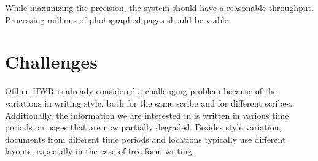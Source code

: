 



While maximizing the precision, the system should have a reasonable throughput. Processing millions of photographed pages should be viable.

\section{Challenges}

Offline HWR is already considered a challenging problem because of the variations in writing style, both for the same scribe and for different scribes.
Additionally, the information we are interested in is written in various time periods on pages that are now partially degraded.
Besides style variation, documents from different time periods and locations typically use different layouts, especially in the case of free-form writing.


